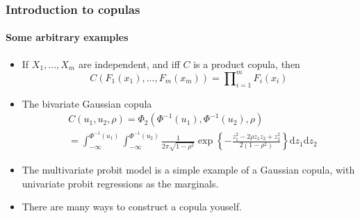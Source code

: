 \documentclass{beamer}
\begin{document}
\begin{frame}
  \frametitle{Introduction to copulas}
  \framesubtitle{Some arbitrary examples}
  \begin{itemize}

  \item If $X_1,...,X_m$ are independent, and iff $C$ is a product copula, then
    \begin{equation*}
      C(F_1(x_1),...,F_m(x_m))=\prod \nolimits _{i=1}^{m} F_i(x_i)
    \end{equation*}

  \item The bivariate Gaussian copula
    \begin{equation*}
      \begin{split}
        &C(u_1,u_2,\rho)=\Phi_2(\Phi^{-1}(u_1),\Phi^{-1}(u_2),\rho)\\
        &= \int_{-\infty}^{\Phi^{-1}(u_1)}\int_{-\infty}^{\Phi^{-1}(u_2)}
        \frac{1}{2\pi\sqrt{1-\rho^2}}\exp\left\{- \frac{z_1^2-2\rho z_1z_2+z_2^2}{2(1-\rho^2)} \right\}\mathrm{d}z_1\mathrm{d}z_2
      \end{split}
    \end{equation*}

  \item The multivariate probit model is a simple example of a Gaussian copula,
    with univariate probit regressions as the marginals.

  \item  There are many ways to construct a copula youself.
  \end{itemize}
\end{frame}
\end{document}
